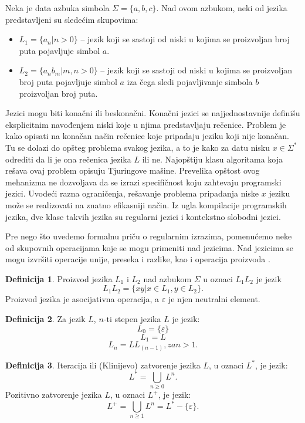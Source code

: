 \documentclass[12pt,oneside]{memoir}
\theoremstyle{plain}
\theoremstyle{definition}
\newtheorem{defn}{Definicija} %
\begin{document}
Neka je data azbuka simbola $\Sigma = \{ a, b, c\}$. Nad ovom azbukom, neki od jezika predstavljeni su sledećim skupovima:
\begin{itemize}
\item[] $L_1 = \{a_n | n > 0\}$ – jezik koji se sastoji od niski u kojima se proizvoljan broj puta pojavljuje simbol $a$.
\item[] $L_2 = \{a_nb_m | m, n > 0\}$ – jezik koji se sastoji od niski u kojima se proizvoljan broj puta pojavljuje simbol $a$ iza čega sledi pojavljivanje simbola $b$ proizvoljan broj puta.
\end{itemize}

Jezici mogu biti konačni ili beskonačni. Konačni jezici se najjednostavnije definišu eksplicitnim navođenjem niski koje u njima predstavljaju rečenice. Problem je kako opisati na konačan način rečenice koje pripadaju jeziku koji nije konačan. Tu se dolazi do opšteg problema svakog jezika, a to je kako za datu nisku $x \in \Sigma^*$ odrediti da li je ona rečenica jezika $L$ ili ne. Najopštiju klasu algoritama koja rešava ovaj problem opisuju Tjuringove mašine. Prevelika opštost ovog mehanizma ne dozvoljava da se izrazi specifičnost koju zahtevaju programski  jezici. Uvodeći razna ograničenja, rešavanje problema pripadanja niske $x$ jeziku može se realizovati na znatno efikasniji način. Iz ugla kompilacije programskih jezika, dve klase takvih jezika su regularni jezici i kontekstno slobodni jezici.  

Pre nego što uvedemo formalnu priču o regularnim izrazima, pomenućemo neke od skupovnih operacijama koje se mogu primeniti nad jezicima. Nad jezicima se mogu izvršiti operacije unije, preseka i razlike, kao i operacija proizvoda \cite{Vitas}. 

\begin{defn}
Proizvod jezika $L_1$ i $L_2$ nad azbukom $\Sigma$ u oznaci $L_1L_2$ je jezik $$L_1L_2 = \{xy | x \in L_1, y \in L_2\}.$$
Proizvod jezika je asocijativna operacija, a {$\varepsilon$} je njen neutralni element.
\end{defn}

\begin{defn}
Za jezik $L$, $n$-ti stepen jezika $L$ je jezik: 
$$L_0 = \{ \varepsilon\} $$ 
$$L_1 = L$$
$$L_n = LL_(n-1), za  n>1.$$
\end{defn}

\begin{defn}
Iteracija ili (Klinijevo) zatvorenje jezika $L$, u oznaci $L^*$, je jezik:
$$ L^* = \bigcup_{n\geq0}L^n.$$
Pozitivno zatvorenje jezika $L$, u oznaci $L^+$, je jezik:
$$ L^+ = \bigcup_{n\geq1}L^n = L^* - \{\varepsilon\}.$$
\end{defn}
\end{document}
